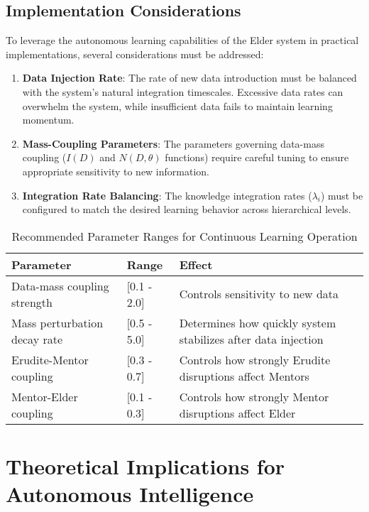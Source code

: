 \subsection{Implementation Considerations}

To leverage the autonomous learning capabilities of the Elder system in practical implementations, several considerations must be addressed:

\begin{enumerate}
    \item \textbf{Data Injection Rate}: The rate of new data introduction must be balanced with the system's natural integration timescales. Excessive data rates can overwhelm the system, while insufficient data fails to maintain learning momentum.
    
    \item \textbf{Mass-Coupling Parameters}: The parameters governing data-mass coupling ($I(D)$ and $N(D, \theta)$ functions) require careful tuning to ensure appropriate sensitivity to new information.
    
    \item \textbf{Integration Rate Balancing}: The knowledge integration rates ($\lambda_i$) must be configured to match the desired learning behavior across hierarchical levels.
\end{enumerate}

\begin{table}[h]
\centering
\caption{Recommended Parameter Ranges for Continuous Learning Operation}
\label{tab:parameter_ranges}
\begin{tabular}{p{4cm} p{3cm} p{7cm}}
\textbf{Parameter} & \textbf{Range} & \textbf{Effect} \\
\hline
Data-mass coupling strength & [0.1 - 2.0] & Controls sensitivity to new data \\
Mass perturbation decay rate & [0.5 - 5.0] & Determines how quickly system stabilizes after data injection \\
Erudite-Mentor coupling & [0.3 - 0.7] & Controls how strongly Erudite disruptions affect Mentors \\
Mentor-Elder coupling & [0.1 - 0.3] & Controls how strongly Mentor disruptions affect Elder \\
\hline
\end{tabular}
\end{table}

\section{Theoretical Implications for Autonomous Intelligence}

